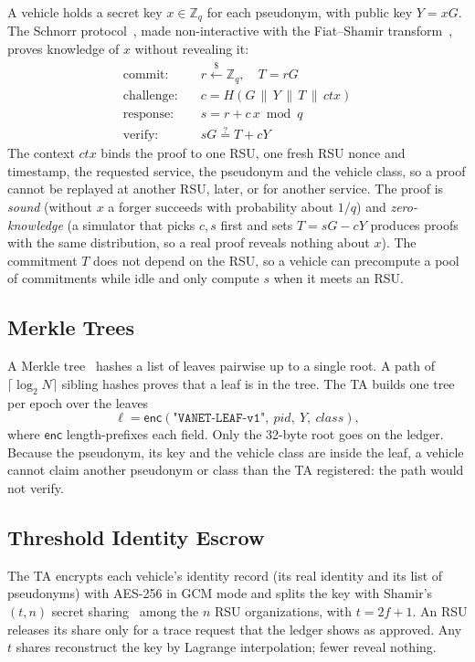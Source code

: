 A vehicle holds a secret key $x \in \mathbb{Z}_q$ for each pseudonym, with public key $Y = xG$. The
Schnorr protocol~\cite{schnorr1991}, made non-interactive with the Fiat--Shamir
transform~\cite{fiat1986}, proves knowledge of $x$ without revealing it:
\begin{align}
  \text{commit:}\quad & r \xleftarrow{\$} \mathbb{Z}_q,\quad T = rG \\
  \text{challenge:}\quad & c = H(G \,\|\, Y \,\|\, T \,\|\, \mathit{ctx}) \\
  \text{response:}\quad & s = r + c\,x \bmod q \\
  \text{verify:}\quad & sG \stackrel{?}{=} T + cY
\end{align}
The context $\mathit{ctx}$ binds the proof to one RSU, one fresh RSU nonce and timestamp, the
requested service, the pseudonym and the vehicle class, so a proof cannot be replayed at another RSU,
later, or for another service. The proof is \emph{sound} (without $x$ a forger succeeds with
probability about $1/q$) and \emph{zero-knowledge} (a simulator that picks $c, s$ first and sets
$T = sG - cY$ produces proofs with the same distribution, so a real proof reveals nothing about $x$).
The commitment $T$ does not depend on the RSU, so a vehicle can precompute a pool of commitments
while idle and only compute $s$ when it meets an RSU.

\subsection{Merkle Trees}

A Merkle tree~\cite{merkle1987} hashes a list of leaves pairwise up to a single root. A path of
$\lceil \log_2 N \rceil$ sibling hashes proves that a leaf is in the tree. The TA builds one tree per
epoch over the leaves
\[
  \ell = \mathsf{enc}(\texttt{"VANET-LEAF-v1"},\ \mathit{pid},\ Y,\ \mathit{class}),
\]
where $\mathsf{enc}$ length-prefixes each field. Only the 32-byte root goes on the ledger. Because
the pseudonym, its key and the vehicle class are inside the leaf, a vehicle cannot claim another
pseudonym or class than the TA registered: the path would not verify.

\subsection{Threshold Identity Escrow}

The TA encrypts each vehicle's identity record (its real identity and its list of pseudonyms) with
AES-256 in GCM mode and splits the key with Shamir's $(t,n)$ secret sharing~\cite{shamir1979} among the $n$
RSU organizations, with $t = 2f+1$. An RSU releases its share only for a trace request that the ledger
shows as approved. Any $t$ shares reconstruct the key by Lagrange interpolation; fewer reveal nothing.

